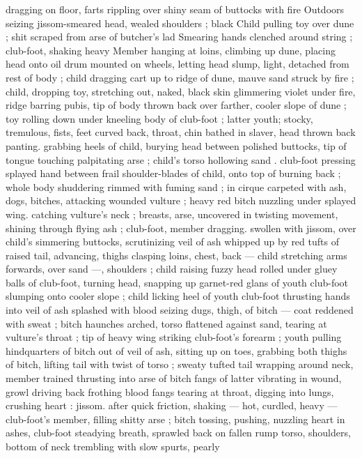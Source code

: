 dragging on floor, farts rippling over shiny seam of buttocks with fire
Outdoors seizing jissom-smeared head, wealed shoulders ; black
Child pulling toy over dune ; shit scraped from arse of butcher's lad
Smearing hands clenched around string ; club-foot, shaking heavy
Member hanging at loins, climbing up dune, placing head onto oil
drum mounted on wheels, letting head slump, light, detached from
rest of body ; child dragging cart up to ridge of dune, mauve sand
struck by fire ; child, dropping toy, stretching out, naked, black skin
glimmering violet under fire, ridge barring pubis, tip of body thrown
back over farther, cooler slope of dune ; toy rolling down under
kneeling body of club-foot ; latter youth; stocky, tremulous, fists, feet
curved back, throat, chin bathed in slaver, head thrown back panting.
grabbing heels of child, burying head between polished buttocks, tip
of tongue touching palpitating arse ; child's torso hollowing sand .
club-foot pressing splayed hand between frail shoulder-blades of
child, onto top of burning back ; whole body shuddering rimmed with
fuming sand ; in cirque carpeted with ash, dogs, bitches, attacking
wounded vulture ; heavy red bitch nuzzling under splayed wing.
catching vulture's neck ; breasts, arse, uncovered in twisting
movement, shining through flying ash ; club-foot, member dragging.
swollen with jissom, over child's simmering buttocks, scrutinizing veil
of ash whipped up by red tufts of raised tail, advancing, thighs
clasping loins, chest, back --- child stretching arms forwards, over
sand ---, shoulders ; child raising fuzzy head rolled under gluey balls
of club-foot, turning head, snapping up garnet-red glans of youth
club-foot slumping onto cooler slope ; child licking heel of youth
club-foot thrusting hands into veil of ash splashed with blood
seizing dugs, thigh, of bitch --- coat reddened with sweat ; bitch
haunches arched, torso flattened against sand, tearing at vulture’s
throat ; tip of heavy wing striking club-foot's forearm ; youth pulling
hindquarters of bitch out of veil of ash, sitting up on toes, grabbing
both thighs of bitch, lifting tail with twist of torso ; sweaty tufted tail
wrapping around neck, member trained thrusting into arse of bitch
fangs of latter vibrating in wound, growl driving back frothing blood
fangs tearing at throat, digging into lungs, crushing heart : jissom.
after quick friction, shaking --- hot, curdled, heavy --- club-foot's
member, filling shitty arse ; bitch tossing, pushing, nuzzling heart in
ashes, club-foot steadying breath, sprawled back on fallen rump
torso, shoulders, bottom of neck trembling with slow spurts, pearly
